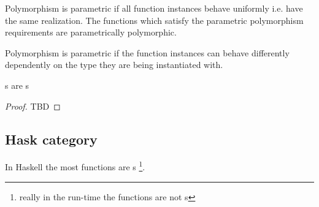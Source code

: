 \begin{definition}
\label{def:pp_function}
Polymorphism is parametric if all function instances behave uniformly
i.e. have the same realization. The functions which satisfy the
parametric polymorphism requirements are parametrically polymorphic.
\end{definition}

\begin{definition}
\label{def:ad_hoc_polymorphism}
Polymorphism is parametric if the function instances can behave
differently dependently on the type they are being instantiated with. 
\end{definition}

\begin{theorem}[Reynolds]
\label{thm:reynolds}
s are s 
\begin{proof}
TBD
\end{proof}
\end{theorem}

\subsection{\textbf{Hask} category}

In Haskell the most functions are s 
\footnote{really in the run-time the functions are not
  s}.  

